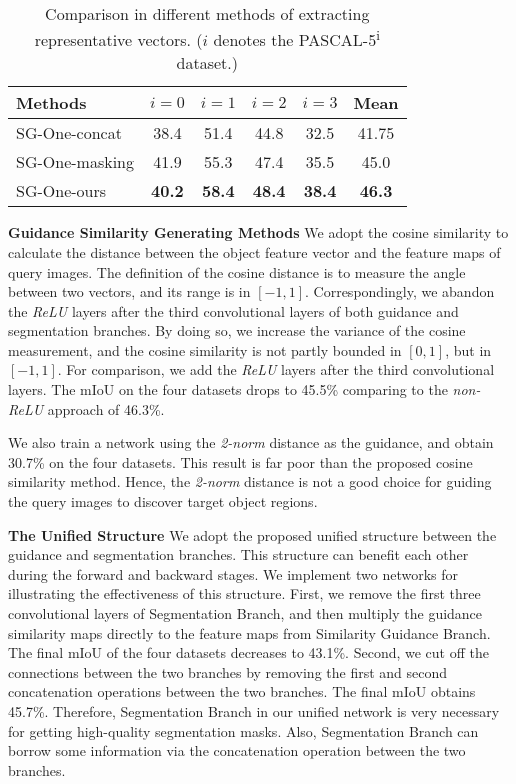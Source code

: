 \documentclass[journal]{IEEEtran}
\begin{document}
\begin{table}\setlength{\tabcolsep}{8pt}
  \centering
  \caption{Comparison in different methods of extracting representative vectors. ($i$ denotes the PASCAL-5\textsuperscript{i} dataset.)}\label{tab_input_process}
  \begin{tabular}{l|cccc|c}
    \hline
    \hline
    \textbf{Methods} & $i=0$ & $i=1$ & $i=2$ & $i=3$ & Mean \\
    \hline
    SG-One-concat &  38.4 & 51.4 & 44.8 & 32.5 & 41.75 \\
SG-One-masking &  41.9 & 55.3 & 47.4 & 35.5 & 45.0 \\
SG-One-ours & \textbf{40.2} & \textbf{58.4}  & \textbf{48.4}  & \textbf{38.4}  & \textbf{46.3} \\
    \hline
    \hline
  \end{tabular}
  \vspace{-10pt}
\end{table}


\noindent \textbf{Guidance Similarity Generating Methods}
We adopt the cosine similarity to calculate the distance between the object feature vector and the feature maps of query images.
The definition of the cosine distance is to measure the angle between two vectors, and its range is in $[-1,1]$.
Correspondingly, we abandon the \textit{ReLU} layers after the third convolutional layers of both guidance and segmentation branches.
By doing so, we increase the variance of the cosine measurement, and the cosine similarity is not partly bounded in $[0,1]$, but in $[-1,1]$.
For comparison, we add the \textit{ReLU} layers after the third convolutional layers. 
The mIoU on the four datasets drops to 45.5\% comparing to the \textit{non-ReLU} approach of 46.3\%.

We also train a network using the \textit{2-norm} distance as the guidance, and obtain 30.7\% on the four datasets.
This result is far poor than the proposed cosine similarity method.
Hence, the \textit{2-norm} distance is not a good choice for guiding the query images to discover target object regions.


\noindent \textbf{The Unified Structure}
We adopt the proposed unified structure between the guidance and segmentation branches.
This structure can benefit each other during the forward and backward stages.
We implement two networks for illustrating the effectiveness of this structure.
First, we remove the first three convolutional layers of Segmentation Branch, and then multiply the guidance similarity maps directly to the feature maps from Similarity Guidance Branch.
The final mIoU of the four datasets decreases to 43.1\%.
Second, we cut off the connections between the two branches by removing the first and second concatenation operations between the two branches.
The final mIoU obtains 45.7\%.
Therefore, Segmentation Branch in our unified network is very necessary for getting high-quality segmentation masks.
Also, Segmentation Branch can borrow some information via the concatenation operation between the two branches. 
\end{document}
